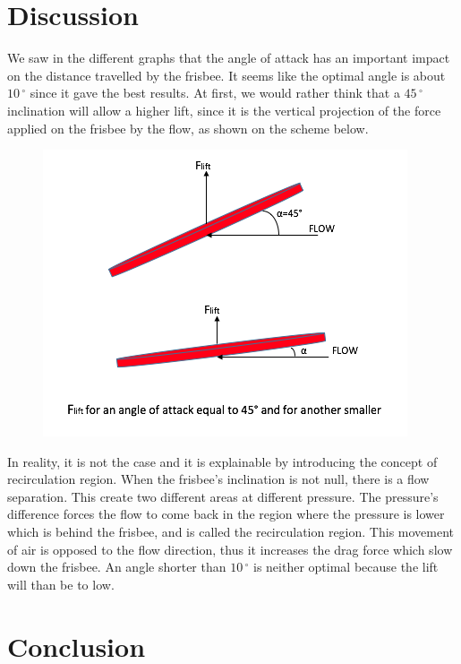 \documentclass[10pt,a4paper]{report}
\begin{document}
\section{Discussion}
We saw in the different graphs that the angle of attack has an important impact on the distance travelled by the frisbee. It seems like the optimal angle is about $10\,^{\circ}$ since it gave the best results. At first, we would rather think that a $45\,^{\circ}$ inclination will allow a higher lift, since it is the vertical projection of the force applied on the frisbee by the flow, as shown on the scheme below.
\begin{figure}[h]
\centering
\includegraphics[scale=0.6]{intuitive.jpg}
\end{figure}
In reality, it is not the case and it is explainable by introducing the concept of recirculation region. When the frisbee's inclination is not null, there is a flow separation. This create two different areas at different pressure. The pressure's difference forces the flow to come back in the region where the pressure is lower which is behind the frisbee, and is called the recirculation region. This movement of air is opposed to the flow direction, thus it increases the drag force which slow down the frisbee. An angle shorter than $10\,^{\circ}$ is neither optimal because the lift will than be to low.
\section{Conclusion}
\end{document}
